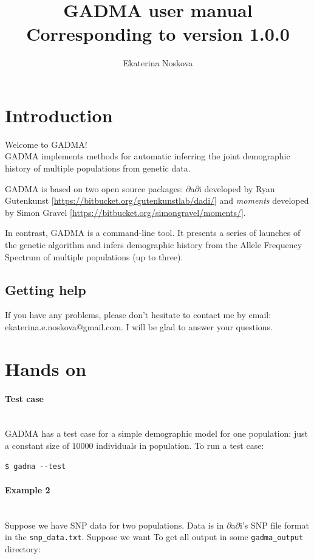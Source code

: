 \documentclass[12pt]{article}
\title{GADMA user manual \\ \normalsize  Corresponding to version 1.0.0}
\author{Ekaterina Noskova}
\date{}
\makeatletter
\newcommand{\dadi}{$\partial$a$\partial$i\xspace}
\newcommand{\moments}{\textit{moments}\xspace}
\newcommand{\py}[1]{\lstinline[language=Python, showstringspaces=False]@#1@}
\makeatother
\begin{document}
\maketitle
\tableofcontents
\clearpage


\section{Introduction}
Welcome to GADMA!\\

GADMA implements methods for automatic inferring the joint demographic history of multiple populations from genetic data.

GADMA is based on two open source packages: \dadi developed by Ryan Gutenkunst [\url{https://bitbucket.org/gutenkunstlab/dadi/}] and \moments developed by Simon Gravel [\url{https://bitbucket.org/simongravel/moments/}].

In contrast, GADMA is a command-line tool. It presents a series of launches of the genetic algorithm and infers demographic history from the Allele Frequency Spectrum of multiple populations (up to three).

\subsection{Getting help}
If you have any problems, please don't hesitate to contact me by email:
ekaterina.e.noskova@gmail.com. I will be glad to answer your questions. 

\section{Hands on}
\paragraph{Test case}\mbox{}\\
GADMA has a test case for a simple demographic model for one population: just a constant size of $10000$ individuals in population. To run a test case:

\begin{lstlisting}
$ gadma --test
\end{lstlisting}

\paragraph{Example 2}\mbox{}\\
Suppose we have SNP data for two populations. Data is in \dadi's SNP file format in the \py{snp_data.txt}. Suppose we want To get all output in some \py{gadma_output} directory:
\end{document}
